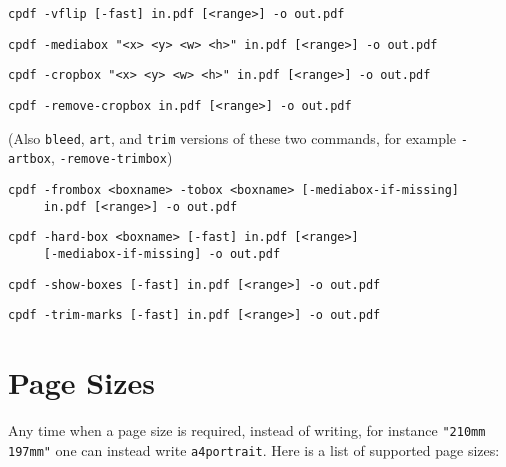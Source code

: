 \documentclass{book}
\begin{document}
\begin{framed}
  \vspace{1.5mm}
  \small\noindent\verb!cpdf -vflip [-fast] in.pdf [<range>] -o out.pdf!
  
  \vspace{1.5mm}
  \small\noindent\verb!cpdf -mediabox "<x> <y> <w> <h>" in.pdf [<range>] -o out.pdf!


  \vspace{1.5mm}
  \small\noindent\verb!cpdf -cropbox "<x> <y> <w> <h>" in.pdf [<range>] -o out.pdf!

  \vspace{1.5mm}
  \small\noindent\verb!cpdf -remove-cropbox in.pdf [<range>] -o out.pdf!

  \vspace{1.5mm}
  (Also \texttt{bleed}, \texttt{art}, and \texttt{trim} versions of these two commands, for example  \texttt{-artbox}, \texttt{-remove-trimbox})

  \vspace{1.5mm}
  \small\noindent\verb!cpdf -frombox <boxname> -tobox <boxname> [-mediabox-if-missing]! \\
  \noindent\verb!     in.pdf [<range>] -o out.pdf!

  \vspace{1.5mm}
  \small\noindent\verb!cpdf -hard-box <boxname> [-fast] in.pdf [<range>]!\\
  \small\noindent\verb!     [-mediabox-if-missing] -o out.pdf!

  \vspace{1.5mm}
  \small\noindent\verb!cpdf -show-boxes [-fast] in.pdf [<range>] -o out.pdf!

  \vspace{1.5mm}
  \small\noindent\verb!cpdf -trim-marks [-fast] in.pdf [<range>] -o out.pdf!

  \end{framed}

  \section{Page Sizes}
\label{papersizes}
  Any time when a page size is required, instead of writing, for instance \texttt{"210mm 197mm"} one can instead write \texttt{a4portrait}. Here is a list of supported page sizes:
\end{document}
